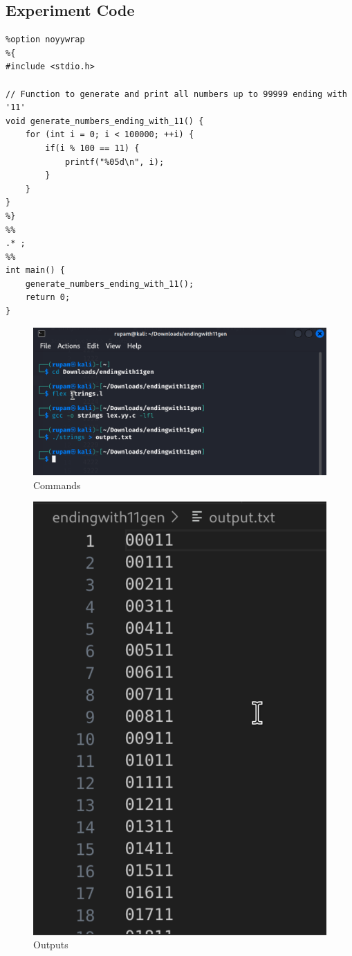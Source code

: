 \documentclass[12pt]{article}
\begin{document}
\subsection*{Experiment Code}
\begin{lstlisting}
%option noyywrap
%{
#include <stdio.h>

// Function to generate and print all numbers up to 99999 ending with '11'
void generate_numbers_ending_with_11() {
    for (int i = 0; i < 100000; ++i) {
        if(i % 100 == 11) {
            printf("%05d\n", i);
        }
    }
}
%}
%%
.* ;
%%
int main() {
    generate_numbers_ending_with_11();
    return 0;
}
\end{lstlisting}
\begin{figure}[H]
    \centering
    \includegraphics[width=1\linewidth]{exp14command.png}
    \caption{Commands}
\end{figure}
\begin{figure}[H]
    \centering
    \includegraphics[width=0.5\linewidth]{exp14output.png}
    \caption{Outputs}  
\end{figure}
\end{document}
